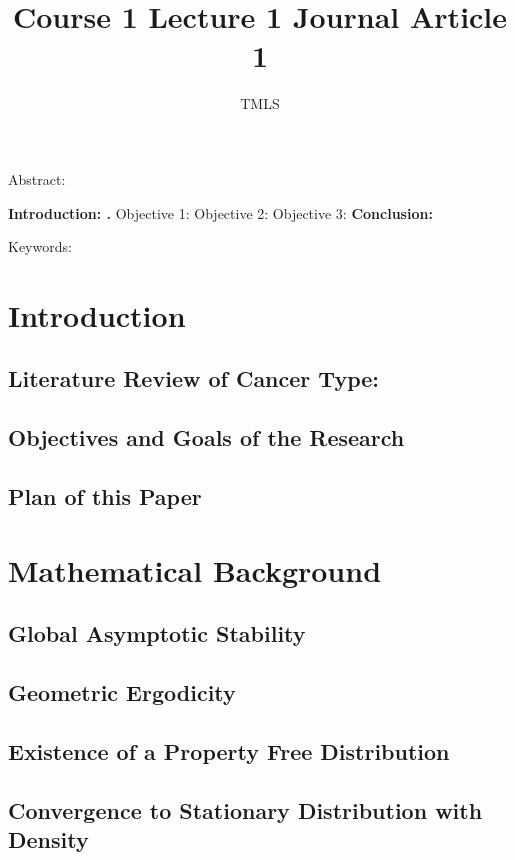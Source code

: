 \documentclass[preprint, 8pt]{elsarticle}
\theoremstyle{definition}
\begin{document}
\begin{frontmatter}
		\title{Course 1 Lecture 1 Journal Article 1}
		\author{TMLS }
		\address{}
		\ead{}	
\end{frontmatter}	
Abstract:
	
\textbf{Introduction: . }
Objective 1: 
Objective 2: 
Objective 3: 
\textbf{Conclusion:}

Keywords:

\section{Introduction}

\subsection{Literature Review of Cancer Type:}

\subsection{Objectives and Goals of the Research}

\subsection{Plan of this Paper}


\section{Mathematical Background}
\subsection{Global Asymptotic Stability}

\subsection{Geometric Ergodicity}

\subsection{Existence of a Property Free Distribution}

\subsection{Convergence to Stationary Distribution with Density}
\end{document}
